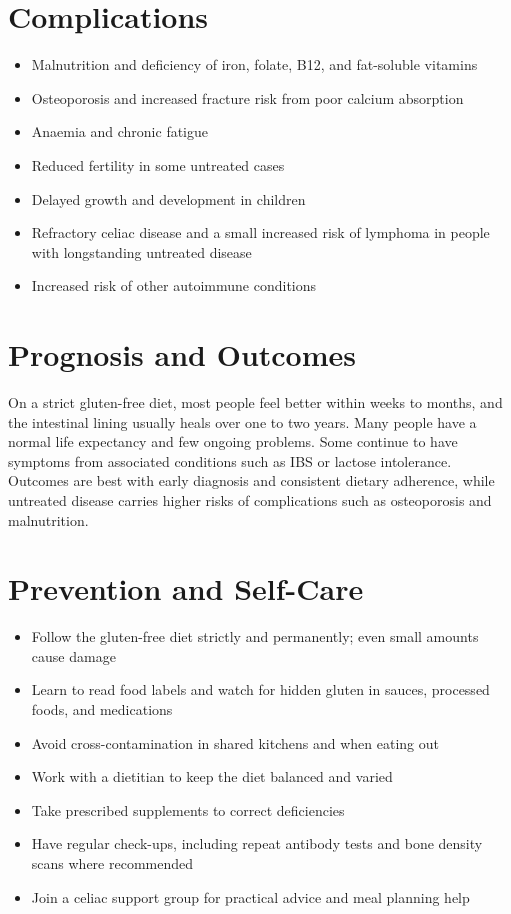 \section*{Complications}
\begin{itemize}
    \item Malnutrition and deficiency of iron, folate, B12, and fat-soluble vitamins
    \item Osteoporosis and increased fracture risk from poor calcium absorption
    \item Anaemia and chronic fatigue
    \item Reduced fertility in some untreated cases
    \item Delayed growth and development in children
    \item Refractory celiac disease and a small increased risk of lymphoma in people with longstanding untreated disease
    \item Increased risk of other autoimmune conditions
\end{itemize}

\section*{Prognosis and Outcomes}
On a strict gluten-free diet, most people feel better within weeks to months, and the intestinal lining usually heals over one to two years. Many people have a normal life expectancy and few ongoing problems. Some continue to have symptoms from associated conditions such as IBS or lactose intolerance. Outcomes are best with early diagnosis and consistent dietary adherence, while untreated disease carries higher risks of complications such as osteoporosis and malnutrition.

\section*{Prevention and Self-Care}
\begin{itemize}
    \item Follow the gluten-free diet strictly and permanently; even small amounts cause damage
    \item Learn to read food labels and watch for hidden gluten in sauces, processed foods, and medications
    \item Avoid cross-contamination in shared kitchens and when eating out
    \item Work with a dietitian to keep the diet balanced and varied
    \item Take prescribed supplements to correct deficiencies
    \item Have regular check-ups, including repeat antibody tests and bone density scans where recommended
    \item Join a celiac support group for practical advice and meal planning help
\end{itemize}

